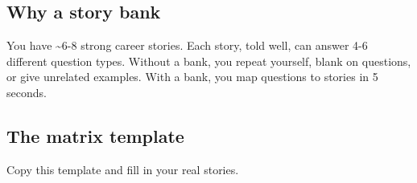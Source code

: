 \documentclass[11pt]{article}
\begin{document}
\subsection{Why a story bank}\label{why-a-story-bank}

You have \textasciitilde6-8 strong career stories. Each story, told well, can answer 4-6 different question types. Without a bank, you repeat yourself, blank on questions, or give unrelated examples. With a bank, you map questions to stories in 5 seconds.

\subsection{The matrix template}\label{the-matrix-template}

Copy this template and fill in your real stories.

\end{document}
